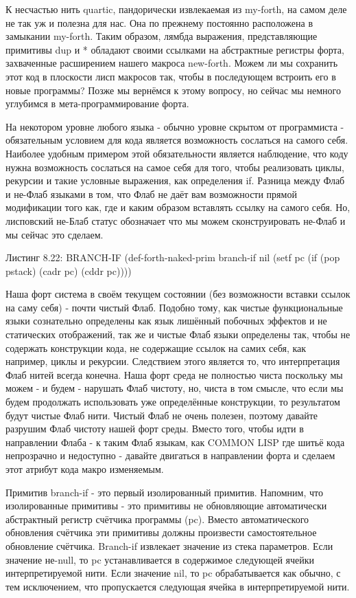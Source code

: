 {{{К несчастью нить quartic, пандорически извлекаемая из my-forth, на самом деле не так уж и полезна для нас. Она по прежнему постоянно расположена в замыкании my-forth. Таким образом, лямбда выражения, представляющие примитивы dup и * обладают своими ссылками на абстрактные регистры форта, захваченные расширением нашего макроса new-forth. Можем ли мы сохранить этот код в плоскости лисп макросов так, чтобы в последующем встроить его в новые программы? Позже мы вернёмся к этому вопросу, но сейчас мы немного углубимся в мета-программирование форта.

На некотором уровне любого языка - обычно уровне скрытом от программиста - обязательным условием для кода является возможность сослаться на самого себя. Наиболее удобным примером этой обязательности является наблюдение, что коду нужна возможность сослаться на самое себя для того, чтобы реализовать циклы, рекурсии и такие условные выражения, как определения if. Разница между Флаб и не-Флаб языками в том, что Флаб не даёт вам возможности прямой модификации того как, где и каким образом вставлять ссылку на самого себя. Но, лисповский не-Блаб статус обозначает что мы можем сконструировать не-Флаб и мы сейчас это сделаем.

Листинг 8.22: BRANCH-IF
(def-forth-naked-prim branch-if nil
(setf pc (if (pop pstack)
(cadr pc)
(cddr pc))))

Наша форт система в своём текущем состоянии (без возможности вставки ссылок на саму себя) - почти чистый Флаб. Подобно тому, как чистые функциональные языки сознательно определены как язык лишённый побочных эффектов и не статических отображений, так же и чистые Флаб языки определены так, чтобы не содержать конструкции кода, не содержащие ссылок на самих себя, как например, циклы и рекурсии. Следствием этого является то, что интерпретация Флаб нитей всегда конечна. Наша форт среда не полностью чиста поскольку мы можем - и будем - нарушать Флаб чистоту, но, чиста в том смысле, что если мы будем продолжать использовать уже определённые конструкции, то результатом будут чистые Флаб нити. Чистый Флаб не очень полезен, поэтому давайте разрушим Флаб чистоту нашей форт среды. Вместо того, чтобы идти в направлении Флаба - к таким Флаб языкам, как COMMON LISP где шитьё кода непрозрачно и недоступно - давайте двигаться в направлении форта и сделаем этот атрибут кода макро изменяемым.

Примитив branch-if - это первый изолированный примитив. Напомним, что изолированные примитивы - это примитивы не обновляющие автоматически абстрактный регистр счётчика программы (pc). Вместо автоматического обновления счётчика эти примитивы должны произвести самостоятельное обновление счётчика. Branch-if извлекает значение из стека параметров. Если значение не-null, то pc устанавливается в содержимое следующей ячейки интерпретируемой нити. Если значение nil, то pc обрабатывается как обычно, с тем исключением, что пропускается следующая ячейка в интерпретируемой нити.

}}}

